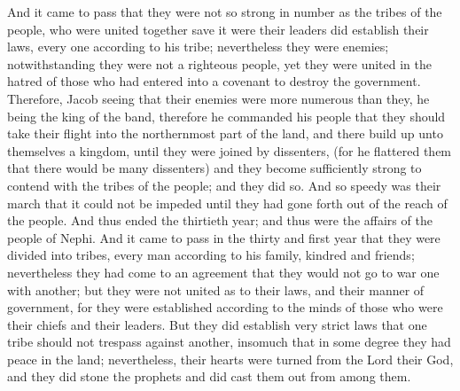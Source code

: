 And it came to pass that they were not so strong in number as the tribes of the people, who were united together save it were their leaders did establish their laws, every one according to his tribe; nevertheless they were enemies; notwithstanding they were not a righteous people, yet they were united in the hatred of those who had entered into a covenant to destroy the government.
\bverse \iffalse Therefore, Jacob seeing that their enemies were more numerous than they, he being the king of the band, therefore he commanded his people that they should take their flight into the northernmost part of the land, and there build up unto themselves a kingdom, until they were joined by dissenters, (for he flattered them that there would be many dissenters) and they become sufficiently strong to contend with the tribes of the people; and they did so. \fi
Therefore, Jacob seeing that their enemies were more numerous than they, he being the king of the band, therefore he commanded his people that they should take their flight into the northernmost part of the land, and there build up unto themselves a kingdom, until they were joined by dissenters, (for he flattered them that there would be many dissenters) and they become sufficiently strong to contend with the tribes of the people; and they did so.
\bverse \iffalse And so speedy was their march that it could not be impeded until they had gone forth out of the reach of the people. And thus ended the thirtieth year; and thus were the affairs of the people of Nephi. \fi
And so speedy was their march that it could not be impeded until they had gone forth out of the reach of the people. And thus ended the thirtieth year; and thus were the affairs of the people of Nephi.
\bverse \iffalse And it came to pass in the thirty and first year that they were divided into tribes, every man according to his family, kindred and friends; nevertheless they had come to an agreement that they would not go to war one with another; but they were not united as to their laws, and their manner of government, for they were established according to the minds of those who were their chiefs and their leaders. But they did establish very strict laws that one tribe should not trespass against another, insomuch that in some degree they had peace in the land; nevertheless, their hearts were turned from the Lord their God, and they did stone the prophets and did cast them out from among them. \fi
And it came to pass in the thirty and first year that they were divided into tribes, every man according to his family, kindred and friends; nevertheless they had come to an agreement that they would not go to war one with another; but they were not united as to their laws, and their manner of government, for they were established according to the minds of those who were their chiefs and their leaders. But they did establish very strict laws that one tribe should not trespass against another, insomuch that in some degree they had peace in the land; nevertheless, their hearts were turned from the Lord their God, and they did stone the prophets and did cast them out from among them.
